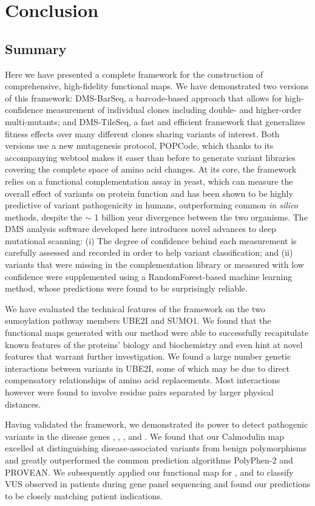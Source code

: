 
\chapter{Conclusion}

\section{Summary}

Here we have presented a complete framework for the construction of comprehensive, high-fidelity functional maps. We have demonstrated two versions of this framework: DMS-BarSeq, a barcode-based approach that allows for high-confidence measurement of individual clones including double- and higher-order multi-mutants; and DMS-TileSeq, a fast and efficient framework that generalizes fitness effects over many different clones sharing variants of interest. Both versions use a new mutagenesis protocol, POPCode, which thanks to its accompanying webtool makes it easer than before to generate variant libraries covering the complete space of amino acid changes. At its core, the framework relies on a functional complementation assay in yeast, which can measure the overall effect of variants on protein function and has been shown to be highly predictive of variant pathogenicity in humans, outperforming common \textit{in silico} methods, despite the $\sim$ 1 billion year divergence between the two organisms. 
The DMS analysis software developed here introduces novel advances to deep mutational scanning: (i) The degree of confidence behind each measurement is carefully assessed and recorded in order to help variant classification; and (ii) variants that were missing in the complementation library or measured with low confidence were supplemented using a RandomForest-based machine learning method, whose predictions were found to be surprisingly reliable. 

We have evaluated the technical features of the framework on the two sumoylation pathway members UBE2I and SUMO1. We found that the functional maps generated with our method were able to successfully recapitulate known features of the proteins' biology and biochemistry and even hint at novel features that warrant further investigation. We found a large number genetic interactions between variants in UBE2I, some of which may be due to direct compensatory relationships of amino acid replacements. Most interactions however were found to involve residue pairs separated by larger physical distances.

Having validated the framework, we demonstrated its power to detect pathogenic variants in the disease genes , , ,  and .  
We found that our Calmodulin map excelled at distinguishing disease-associated variants from benign polymorphisms and greatly outperformed the common prediction algorithms PolyPhen-2 and PROVEAN. We subsequently applied our functional map for ,  and  to classify VUS observed in patients during gene panel sequencing and found our predictions to be closely matching patient indications.


